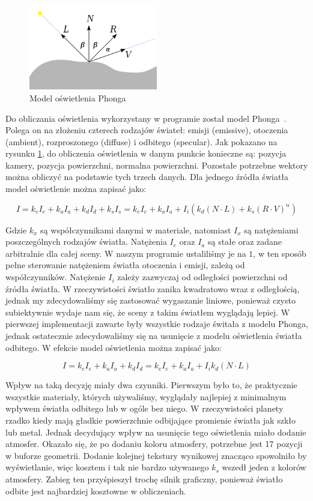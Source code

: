 \begin{figure}
\centering
	\includegraphics[width=0.5\textwidth]{img/phong.png}
\caption{Model oświetlenia Phonga}
\label{fig:phong}
\end{figure}

Do obliczania oświetlenia wykorzystany w programie został model Phonga~\cite{wiki:phong}. Polega on na złożeniu czterech rodzajów świateł: emisji (emissive), otoczenia (ambient), rozproszonego (diffuse) i odbitego (specular). Jak pokazano na rysunku \hyperref[fig:phong]{\ref*{fig:phong}}, do obliczenia oświetlenia w danym punkcie konieczne są: pozycja kamery, pozycja powierzchni, normalna powierzchni. Pozostałe potrzebne wektory można obliczyć na podstawie tych trzech danych. Dla jednego źródła światła model oświetlenie można zapisać jako:


$$ I = k_e I_e + k_a I_a + k_d I_d + k_s I_s = k_e I_e + k_a I_a + I_i( k_d( N \cdot L ) + k_s ( R \cdot V )^n ) $$

Gdzie $k_x$ są współczynnikami danymi w materiale, natomiast $I_x$ są natężeniami poszczególnych rodzajów światła. Natężenia $I_e$ oraz $I_a$ są stałe oraz zadane arbitralnie dla całej sceny. W naszym programie ustaliliśmy je na $1$, w ten sposób pełne sterowanie natężeniem światła otoczenia i emisji, zależą od współczynników. Natężenie $I_i$ zależy zazwyczaj od odległości powierzchni od źródła światła. W rzeczywistości światło zanika kwadratowo wraz z odległością, jednak my zdecydowaliśmy się zastosować wygaszanie liniowe, ponieważ czysto subiektywnie wydaje nam się, że sceny z takim światłem wyglądają lepiej. W pierwszej implementacji zawarte były wszystkie rodzaje świtała z modelu Phonga, jednak ostatecznie zdecydowaliśmy się na usunięcie z modelu oświetlenia światła odbitego. W efekcie model oświetlenia można zapisać jako:

$$ I = k_e I_e + k_a I_a + k_d I_d = k_e I_e + k_a I_a + I_i k_d( N \cdot L ) $$

Wpływ na taką decyzję miały dwa czynniki. Pierwszym było to, że praktycznie wszystkie materiały, których używaliśmy, wyglądały najlepiej z minimalnym wpływem światła odbitego lub w ogóle bez niego. W rzeczywistości planety rzadko kiedy mają gładkie powierzchnie odbijające promienie światła jak szkło lub metal. Jednak decydujący wpływ na usunięcie tego oświetlenia miało dodanie atmosfer. Okazało się, że po dodaniu koloru atmosfery, potrzebne jest 17 pozycji w buforze geometrii. Dodanie kolejnej tekstury wynikowej znacząco spowolniło by wyświetlanie, więc kosztem i tak nie bardzo używanego $k_s$ wszedł jeden z kolorów atmosfery. Zabieg ten przyśpieszył trochę silnik graficzny, ponieważ światło odbite jest najbardziej kosztowne w obliczeniach.

